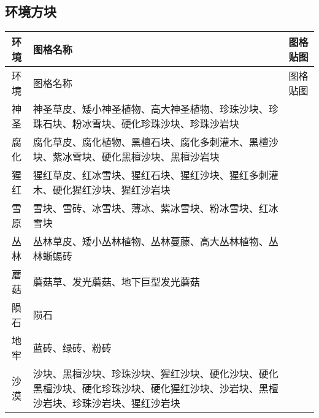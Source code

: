\subsection{环境方块}
\begin{longtable}{|c|p{}|p{}|}
\hline 环境&图格名称&图格贴图\\\hline
\endfirsthead
\hline 环境&图格名称&图格贴图\\\hline
\endhead
\hline
\endfoot
神圣&神圣草皮、矮小神圣植物、高大神圣植物、珍珠沙块、珍珠石块、粉冰雪块、硬化珍珠沙块、珍珠沙岩块&\\\hline
腐化&腐化草皮、腐化植物、黑檀石块、腐化多刺灌木、黑檀沙块、紫冰雪块、硬化黑檀沙块、黑檀沙岩块&\\\hline
猩红&猩红草皮、红冰雪块、猩红石块、猩红沙块、猩红多刺灌木、硬化猩红沙块、猩红沙岩块&\\\hline
雪原&雪块、雪砖、冰雪块、薄冰、紫冰雪块、粉冰雪块、红冰雪块&\\\hline
丛林&丛林草皮、矮小丛林植物、丛林蔓藤、高大丛林植物、丛林蜥蜴砖&\\\hline
蘑菇&蘑菇草、发光蘑菇、地下巨型发光蘑菇&\\\hline
陨石&陨石&\\\hline
地牢&蓝砖、绿砖、粉砖&\\\hline
沙漠&沙块、黑檀沙块、珍珠沙块、猩红沙块、硬化沙块、硬化黑檀沙块、硬化珍珠沙块、硬化猩红沙块、沙岩块、黑檀沙岩块、珍珠沙岩块、猩红沙岩块
\end{longtable}

